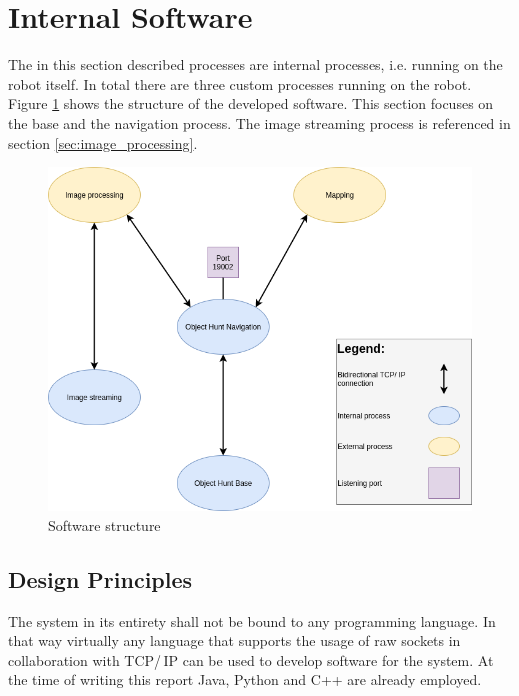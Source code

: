 \newpage

\section{Internal Software}

The in this section described processes are internal processes, i.e. running on the robot itself. In total there are three custom processes running on the robot. Figure \ref{fig:software} shows the structure of the developed software. This section focuses on the base and the navigation process. The image streaming process is referenced in section \ref{sec:image_processing}.

\begin{figure}[H]
\centering
\includegraphics[scale=0.6]{sources/software_structure.png}
\caption[Software structure]{Software structure}
\label{fig:software}
\end{figure}

\subsection{Design Principles}

The system in its entirety shall not be bound to any programming language. In that way virtually any language that supports the usage of raw sockets in collaboration with TCP/\,IP can be used to develop software for the system. At the time of writing this report Java, Python and C++ are already employed.\\

